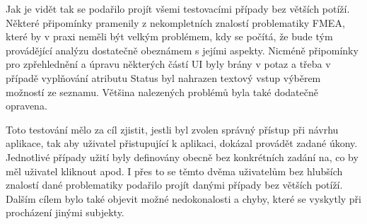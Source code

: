 Jak je vidět tak se podařilo projít všemi testovacími případy bez větších potíží. Některé připomínky pramenily z nekompletních znalostí problematiky FMEA, které by v praxi neměli být velkým problémem, kdy se počítá, že bude tým provádějící analýzu dostatečně obeznámem s jejími aspekty. Nicméně připomínky pro zpřehlednění a úpravu některých částí UI byly brány v potaz a třeba v případě vyplňování atributu Status byl nahrazen textový vstup výběrem možností ze seznamu. Většina nalezených problémů byla také dodatečně opravena. 

Toto testování mělo za cíl zjistit, jestli byl zvolen správný přístup při návrhu aplikace, tak aby uživatel přistupující k aplikaci, dokázal provádět zadané úkony. Jednotlivé případy užití byly definovány obecně bez konkrétních zadání na, co by měl uživatel kliknout apod. I přes to se těmto dvěma uživatelům bez hlubších znalostí dané problematiky podařilo projít danými případy bez větších potíží. Dalším cílem bylo také objevit možné nedokonalosti a chyby, které se vyskytly při procházení jinými subjekty.  



